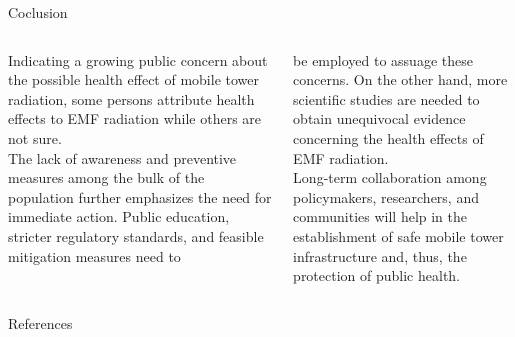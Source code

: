 \documentclass[7pt, aspectratio=169]{beamer}
\begin{document}
\begin{frame}{Coclusion}
\begin{columns}
    Indicating a growing public concern about the possible health effect of mobile tower radiation, some persons attribute health effects to EMF radiation while others are not sure.\\
    \vspace{0.1cm}
    The lack of awareness and preventive measures among the bulk of the population further emphasizes the need for immediate action. Public education, stricter regulatory standards, and feasible mitigation measures need to

    
      be employed to assuage these concerns. On the other hand, more scientific studies are needed to obtain unequivocal evidence concerning the health effects of EMF radiation.\\
      \vspace{0.1cm}
      Long-term collaboration among policymakers, researchers, and communities will help in the establishment of safe mobile tower infrastructure and, thus, the protection of public health.

    
\end{columns}
    
\end{frame}

\begin{frame}[allowframebreaks]{References}
    \nocite{hardell2009epidemiological,leszczynski2002non,blackman1982effects,agarwal2006relationship,frey2020evolution,magras1997rf,simko2007cell,altamura1997influence,charles2003electromagnetic,world2007elf,abdel2007neurobehavioral,hocking1996cancer,moszczynski1999effect,pathak2003harmful,mcintosh2005numerical,kumar2006induced,polk1995handbook,kumar2011effect,gabriel1996dielectric,adair2002biological,stuchly2002biological,adey1981tissue,kumar2008interaction,ncrp1985biological,protection2002maximum}
    \printbibliography %

\end{frame}
\end{document}
